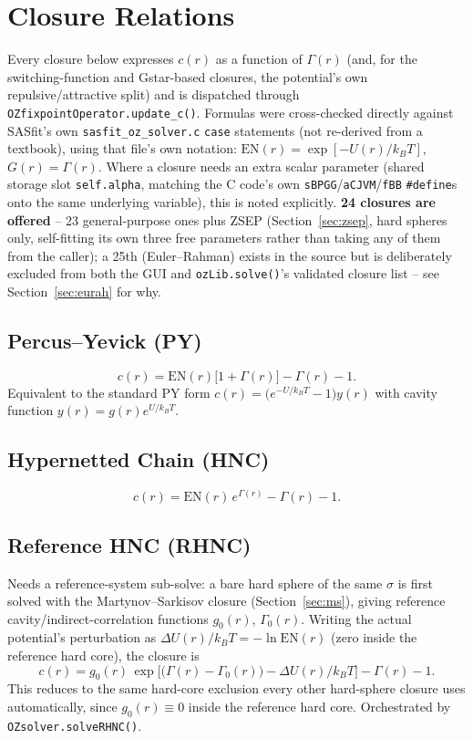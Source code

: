 \documentclass[11pt,a4paper]{article}
\newcommand{\code}[1]{\texttt{#1}}
\begin{document}
\clearpage
\section{Closure Relations}
\label{sec:closures}

Every closure below expresses $c(r)$ as a function of $\Gamma(r)$ (and, for the
switching-function and Gstar-based closures, the potential's own
repulsive/attractive split) and is dispatched through
\code{OZfixpointOperator.update\_c()}. Formulas were cross-checked directly
against SASfit's own \code{sasfit\_oz\_solver.c} \code{case} statements (not
re-derived from a textbook), using that file's own notation:
$\mathrm{EN}(r)=\exp[-U(r)/k_BT]$, $G(r)=\Gamma(r)$. Where a closure needs an
extra scalar parameter (shared storage slot \code{self.alpha}, matching the
C code's own \code{sBPGG}/\code{aCJVM}/\code{fBB} \code{\#define}s onto the
same underlying variable), this is noted explicitly. \textbf{24 closures are
offered} -- 23 general-purpose ones plus ZSEP (Section~\ref{sec:zsep}, hard
spheres only, self-fitting its own three free parameters rather than taking
any of them from the caller); a 25th (Euler--Rahman) exists in the source
but is deliberately excluded from both the GUI and \code{ozLib.solve()}'s
validated closure list -- see Section~\ref{sec:eurah} for why.

\subsection{Percus--Yevick (PY)}
\begin{equation}
  c(r) = \mathrm{EN}(r)\big[1+\Gamma(r)\big] - \Gamma(r) - 1.
\end{equation}
Equivalent to the standard PY form $c(r)=\big(e^{-U/k_BT}-1\big)y(r)$ with
cavity function $y(r)=g(r)e^{U/k_BT}$.

\subsection{Hypernetted Chain (HNC)}
\begin{equation}
  c(r) = \mathrm{EN}(r)\,e^{\Gamma(r)} - \Gamma(r) - 1.
\end{equation}

\subsection{Reference HNC (RHNC)}
\label{sec:rhnc}
Needs a reference-system sub-solve: a bare hard sphere of the same $\sigma$ is
first solved with the Martynov--Sarkisov closure (Section~\ref{sec:ms}),
giving reference cavity/indirect-correlation functions $g_0(r)$, $\Gamma_0(r)$.
Writing the actual potential's perturbation as
$\Delta U(r)/k_BT = -\ln\mathrm{EN}(r)$ (zero inside the reference hard core),
the closure is
\begin{equation}
  c(r) = g_0(r)\,\exp\!\big[\big(\Gamma(r)-\Gamma_0(r)\big) - \Delta U(r)/k_BT\big] - \Gamma(r) - 1.
\end{equation}
This reduces to the same hard-core exclusion every other hard-sphere closure
uses automatically, since $g_0(r)\equiv0$ inside the reference hard core.
Orchestrated by \code{OZsolver.solveRHNC()}.
\end{document}
